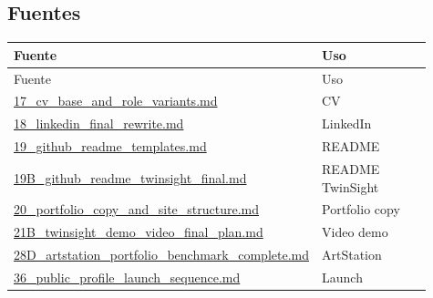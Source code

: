 \subsection{Fuentes}


\begin{center}
\scriptsize
\begin{longtable}{>{\raggedright\arraybackslash}p{0.455\linewidth} >{\raggedright\arraybackslash}p{0.455\linewidth}}
\toprule
Fuente & Uso \\
\midrule
\endfirsthead
\toprule
Fuente & Uso \\
\midrule
\endhead
\href{file:///E:/Laboral/17_cv_base_and_role_variants.md}{17\_cv\_base\_and\_role\_variants.md} & CV \\
\href{file:///E:/Laboral/18_linkedin_final_rewrite.md}{18\_linkedin\_final\_rewrite.md} & LinkedIn \\
\href{file:///E:/Laboral/19_github_readme_templates.md}{19\_github\_readme\_templates.md} & README \\
\href{file:///E:/Laboral/19B_github_readme_twinsight_final.md}{19B\_github\_readme\_twinsight\_final.md} & README TwinSight \\
\href{file:///E:/Laboral/20_portfolio_copy_and_site_structure.md}{20\_portfolio\_copy\_and\_site\_structure.md} & Portfolio copy \\
\href{file:///E:/Laboral/21B_twinsight_demo_video_final_plan.md}{21B\_twinsight\_demo\_video\_final\_plan.md} & Video demo \\
\href{file:///E:/Laboral/28D_artstation_portfolio_benchmark_complete.md}{28D\_artstation\_portfolio\_benchmark\_complete.md} & ArtStation \\
\href{file:///E:/Laboral/36_public_profile_launch_sequence.md}{36\_public\_profile\_launch\_sequence.md} & Launch \\
\bottomrule
\end{longtable}
\end{center}
